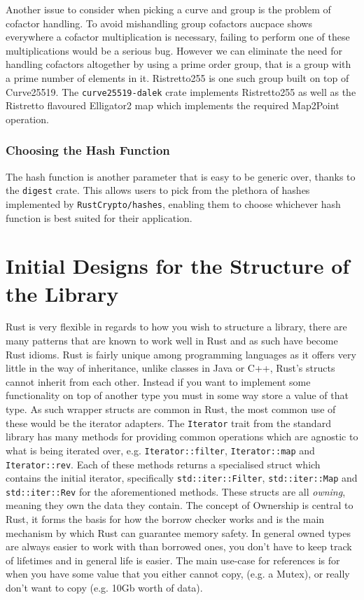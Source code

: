 Another issue to consider when picking a curve and group is the problem of cofactor handling.
To avoid mishandling group cofactors \gls{aucpace} shows everywhere a cofactor multiplication is necessary, failing to perform one of these multiplications would be a serious bug.
However we can eliminate the need for handling cofactors altogether by using a prime order group, that is a group with a prime number of elements in it.
Ristretto255 \cite{ristretto255} is one such group built on top of Curve25519.
The \texttt{curve25519-dalek} crate implements Ristretto255 as well as the Ristretto flavoured Elligator2 map \cite{elligator2} which implements the required \textsf{Map2Point} operation.

\subsubsection{Choosing the Hash Function}
The hash function is another parameter that is easy to be generic over, thanks to the \texttt{digest} crate.
This allows users to pick from the plethora of hashes implemented by \texttt{RustCrypto/hashes}, enabling them to choose whichever hash function is best suited for their application.

\section{Initial Designs for the Structure of the Library}
Rust is very flexible in regards to how you wish to structure a library, there are many patterns that are known to work well in Rust and as such have become Rust idioms.
Rust is fairly unique among programming languages as it offers very little in the way of inheritance, unlike classes in Java or C++, Rust's structs cannot inherit from each other.
Instead if you want to implement some functionality on top of another type you must in some way store a value of that type.
As such wrapper structs are common in Rust, the most common use of these would be the iterator adapters.
The \texttt{Iterator} trait from the standard library has many methods for providing common operations which are agnostic to what is being iterated over, e.g. \texttt{Iterator::filter}, \texttt{Iterator::map} and \texttt{Iterator::rev}.
Each of these methods returns a specialised struct which contains the initial iterator, specifically \texttt{std::iter::Filter}, \texttt{std::iter::Map} and \texttt{std::iter::Rev} for the aforementioned methods.
These structs are all \textit{owning}, meaning they own the data they contain.
The concept of Ownership is central to Rust, it forms the basis for how the borrow checker works and is the main mechanism by which Rust can guarantee memory safety.
In general owned types are always easier to work with than borrowed ones, you don't have to keep track of lifetimes and in general life is easier.
The main use-case for references is for when you have some value that you either cannot copy, (e.g. a Mutex), or really don't want to copy (e.g. 10Gb worth of data).

